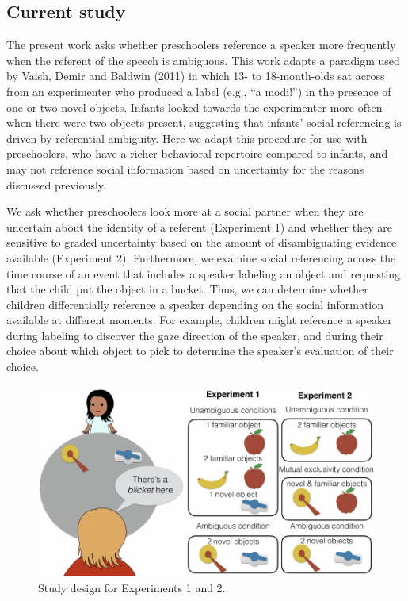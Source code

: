 \documentclass[a4paper,man,apacite,floatsintext]{apa6}
\newenvironment{CodeChunk}{}{}
\begin{document}
\subsection{Current study}\label{current-study}

The present work asks whether preschoolers reference a speaker more
frequently when the referent of the speech is ambiguous. This work
adapts a paradigm used by Vaish, Demir and Baldwin (2011) in which 13-
to 18-month-olds sat across from an experimenter who produced a label
(e.g., ``a modi!'') in the presence of one or two novel objects. Infants
looked towards the experimenter more often when there were two objects
present, suggesting that infants' social referencing is driven by
referential ambiguity. Here we adapt this procedure for use with
preschoolers, who have a richer behavioral repertoire compared to
infants, and may not reference social information based on uncertainty
for the reasons discussed previously.

We ask whether preschoolers look more at a social partner when they are
uncertain about the identity of a referent (Experiment 1) and whether
they are sensitive to graded uncertainty based on the amount of
disambiguating evidence available (Experiment 2). Furthermore, we
examine social referencing across the time course of an event that
includes a speaker labeling an object and requesting that the child put
the object in a bucket. Thus, we can determine whether children
differentially reference a speaker depending on the social information
available at different moments. For example, children might reference a
speaker during labeling to discover the gaze direction of the speaker,
and during their choice about which object to pick to determine the
speaker's evaluation of their choice.

\begin{CodeChunk}
\begin{figure}[h]

{\centering \includegraphics{figs/design-1} 

}

\caption[Study design for Experiments 1 and 2]{Study design for Experiments 1 and 2.}\label{fig:design}
\end{figure}
\end{CodeChunk}
\end{document}
